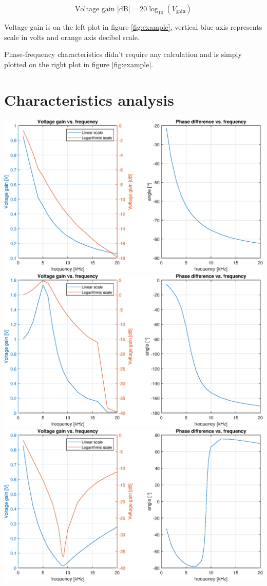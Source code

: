 \documentclass[notitlepage, a4paper, 11pt]{article}
\begin{document}
	\begin{equation}
		\text{Voltage gain [dB]} = 20 \log_{10}(V_{\text{gain}})
	\end{equation}
	
	Voltage gain is on the left plot in figure \ref{fig:example}, vertical blue axis represents scale in volts and orange axis decibel scale.
	
	Phase-frequency characteristics didn't require any calculation and is simply plotted on the right plot in figure \ref{fig:example}.
	
	\section{Characteristics analysis}
	\includegraphics[width=\textwidth]{../Matlab/img/11.eps}
	\includegraphics[width=\textwidth]{../Matlab/img/12.eps}
	\includegraphics[width=\textwidth]{../Matlab/img/131.eps}
\end{document}
